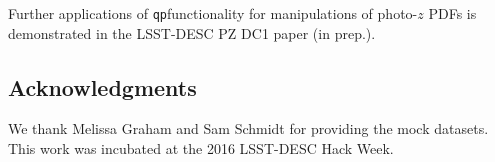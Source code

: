 \documentclass[\docopts]{\docclass}
\newcommand{\qp}{\texttt{qp}}
\newcommand{\pz}{photo-$z$ PDF}
\begin{document}
Further applications of \qp functionality for manipulations of \pz s is 
demonstrated in the LSST-DESC PZ DC1 paper (in prep.).

\subsection*{Acknowledgments}


We thank Melissa Graham and Sam Schmidt for providing the mock datasets.  This 
work was incubated at the 2016 LSST-DESC Hack Week.







\end{document}
